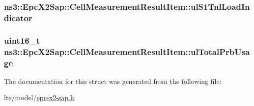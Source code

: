 \subsubsection[{\texorpdfstring{ul\+S1\+Tnl\+Load\+Indicator}{ulS1TnlLoadIndicator}}]{ ns3\+::\+Epc\+X2\+Sap\+::\+Cell\+Measurement\+Result\+Item\+::ul\+S1\+Tnl\+Load\+Indicator}\hypertarget{structns3_1_1EpcX2Sap_1_1CellMeasurementResultItem_ac75b8585b28aae3baedb9b2c92ad8b57}{}\label{structns3_1_1EpcX2Sap_1_1CellMeasurementResultItem_ac75b8585b28aae3baedb9b2c92ad8b57}
\subsubsection[{\texorpdfstring{ul\+Total\+Prb\+Usage}{ulTotalPrbUsage}}]{\setlength{\rightskip}{0pt plus 5cm}uint16\+\_\+t ns3\+::\+Epc\+X2\+Sap\+::\+Cell\+Measurement\+Result\+Item\+::ul\+Total\+Prb\+Usage}\hypertarget{structns3_1_1EpcX2Sap_1_1CellMeasurementResultItem_a05cabbc63cbdcab81b23ff67b08695a2}{}\label{structns3_1_1EpcX2Sap_1_1CellMeasurementResultItem_a05cabbc63cbdcab81b23ff67b08695a2}


The documentation for this struct was generated from the following file\+:\begin{DoxyCompactItemize}
\item 
lte/model/\hyperlink{epc-x2-sap_8h}{epc-\/x2-\/sap.\+h}\end{DoxyCompactItemize}
